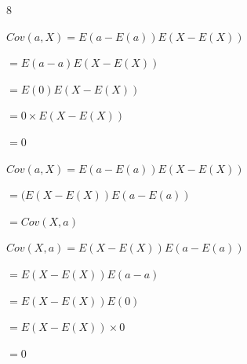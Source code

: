 \documentclass[12 pt]{article}
\begin{document}
    \begin{exercise}{8}
    \hfill

    $Cov(a, X) = E(a - E(a)) E(X-E(X))$
    
    $= E(a-a)E(X-E(X))$

    $= E(0) E(X-E(X))$

    $= 0 \times E(X-E(X))$

    $=0$

    \hfill

    $Cov(a,X) = E(a-E(a))E(X-E(X))$

    $= (E(X-E(X))E(a-E(a))$

    $= Cov(X,a)$

    \hfill

    $Cov(X,a) = E(X-E(X))E(a-E(a))$

    $= E(X- E(X))E(a-a)$

    $= E(X - E(X)) E(0)$

    $= E(X-E(X)) \times 0$

    $= 0$
    
    \hfill    
    \end{exercise}
\end{document}

